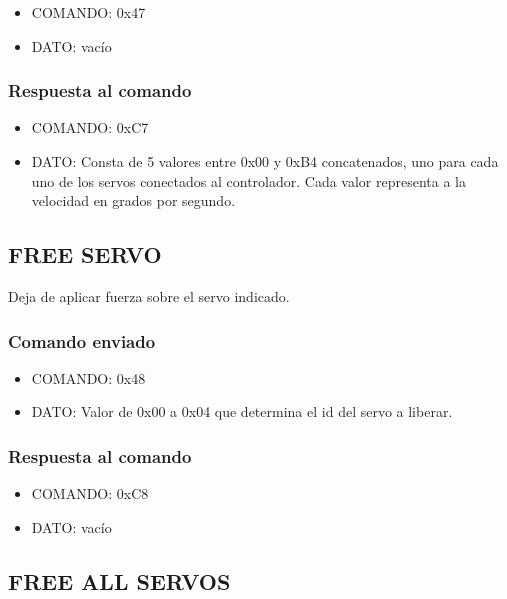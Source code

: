 \documentclass[a4paper,10pt]{article}
\begin{document}
\begin{itemize}
	\item{COMANDO:} 0x47
	\item{DATO:} vac\'io
\end{itemize}

\subsubsection*{Respuesta al comando}

\begin{itemize}
	\item{COMANDO:} 0xC7
	\item{DATO:} Consta de 5 valores entre 0x00 y 0xB4 concatenados, uno para cada uno de los servos conectados al controlador.
	Cada valor representa a la velocidad en grados por segundo.
\end{itemize}

\subsection{FREE SERVO}
\label{free_servo}

Deja de aplicar fuerza sobre el servo indicado.

\subsubsection*{Comando enviado}

\begin{itemize}
	\item{COMANDO:} 0x48
	\item{DATO:} Valor de 0x00 a 0x04 que determina el id del servo a liberar.
\end{itemize}

\subsubsection*{Respuesta al comando}

\begin{itemize}
	\item{COMANDO:} 0xC8
	\item{DATO:} vac\'io
\end{itemize}

\subsection{FREE ALL SERVOS}
\label{free_all_servos}
\end{document}
